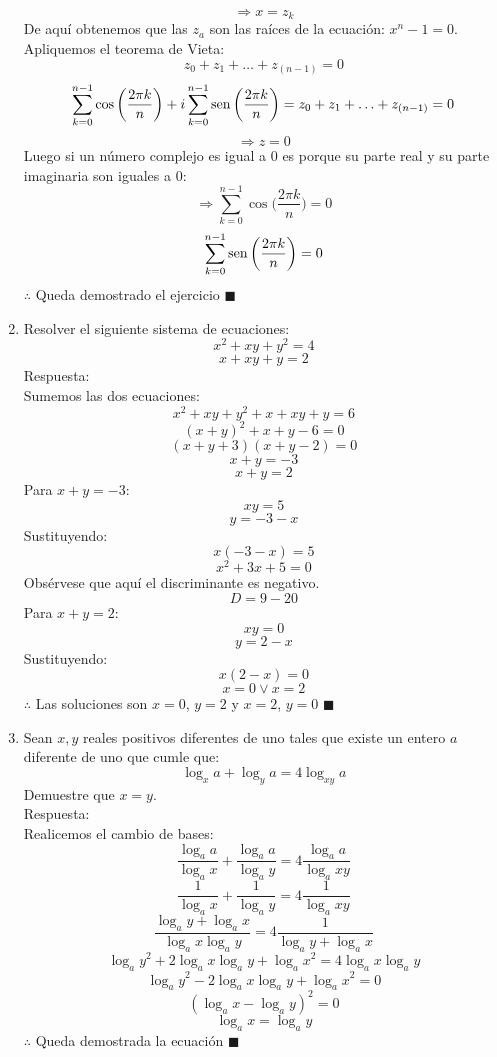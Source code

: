 \documentclass{book}
\newcommand{\sen}{\mathop{\rm sen}\nolimits} %
\begin{document}
\begin{enumerate}
          $$\Rightarrow x=z_k$$
          De aquí obtenemos que las $z_a$ son las raíces de la ecuación:   $x^n-1=0$. Apliquemos el teorema de Vieta:
          $$z_0+z_1+\ldots+z_(n-1)=0$$
          $$\sum_{k=0}^{n-1}\cos{\bigg(\frac{2\pi k}{n}\bigg)} +i\sum_{k=0}^{n-1}\sen{\bigg(\frac{2\pi k}{n}\bigg)}=z_0+z_1+\ldots+z_{(n-1)}=0$$
          $$\Rightarrow z=0$$
          Luego si un número complejo es igual a 0 es porque su parte real y su parte imaginaria son iguales a 0:
          $$\Rightarrow \sum_{k=0}^{n-1}\cos{\bigg(\frac{2\pi k}{n}\bigg)} =0$$
          $$\sum_{k=0}^{n-1}\sen{\bigg(\frac{2\pi k}{n}\bigg)}=0$$
          $\therefore$ Queda demostrado el ejercicio $\blacksquare$\\
    \item Resolver el siguiente sistema de ecuaciones:
          $$x^2+xy+y^2=4$$
          $$x+xy+y=2$$
          Respuesta:\\
          Sumemos las dos ecuaciones:
          $$x^2+xy+y^2+x+xy+y=6$$
          $${(x+y)}^2+x+y-6=0$$
          $$(x+y+3)(x+y-2)=0$$
          $$x+y=-3$$
          $$x+y=2$$
          Para $x+y=-3$:
          $$xy=5$$
          $$y=-3-x$$
          Sustituyendo:
          $$x(-3-x)=5$$
          $$x^2+3x+5=0$$
          Obsérvese que aquí el discriminante es negativo.
          $$D=9-20$$
          Para $x+y=2$:
          $$xy=0$$
          $$y=2-x$$
          Sustituyendo:
          $$x(2-x)=0$$
          $$x=0  \vee  x=2$$
          $\therefore$ Las soluciones son $x=0$, $y=2$  y  $x=2$, $y=0$ $\blacksquare$\\
    \item Sean $x,y$ reales positivos diferentes de uno tales que existe un entero $a$ diferente de uno que cumle que:
          $$\log_{x}a+\log_{y}a=4\log_{xy}a$$
          Demuestre que $x=y$.\\
          Respuesta:\\
          Realicemos el cambio de bases:
          $$\frac{\log_{a}a}{\log_{a}x}+\frac{\log_{a}a}{\log_{a}y}=4  \frac{\log_{a}a}{\log_{a}xy}  $$
          $$\frac{1}{\log_{a}x} +\frac{1}{\log_{a}y}=4 \frac{1}{\log_{a}xy} $$
          $$\frac{\log_{a}y+\log_{a}x}{\log_{a}x\log_{a}y} =4 \frac{1}{\log_{a}y+\log_{a}x }$$
          $${\log_{a}y}^2+2 \log_{a}x \log_{a}y +{\log_{a}x}^2=4\log_{a}x \log_{a}y$$
          $${\log_{a}y}^2-2 \log_{a}x \log_{a}y +{\log_{a}x}^2=0$$
          $${(\log_{a}x -\log_{a}y )} ^2=0$$
          $$\log_{a}x =\log_{a}y $$
          $\therefore$ Queda demostrada la ecuación $\blacksquare$\\

\end{enumerate}
\end{document}
